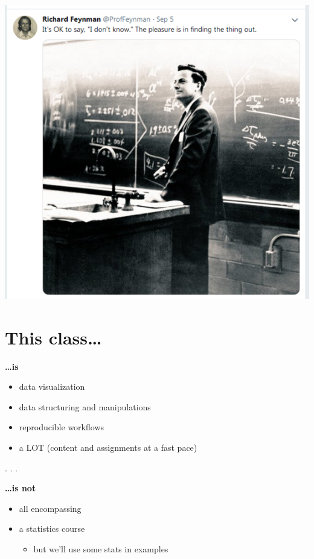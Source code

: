 \documentclass[
  letterpaper,
  DIV=11,
  numbers=noendperiod,
  oneside]{scrartcl}
\providecommand{\tightlist}{%
  \setlength{\itemsep}{0pt}\setlength{\parskip}{0pt}}\usepackage{longtable,booktabs,array}
\begin{document}
\includegraphics{./images/feynman_problemsolve.png}

\hypertarget{this-class}{%
\section{This class\ldots{}}\label{this-class}}

\textbf{\ldots is}

\begin{itemize}
\tightlist
\item
  data visualization
\item
  data structuring and manipulations
\item
  reproducible workflows
\item
  a LOT (content and assignments at a fast pace)
\end{itemize}

. . .

\textbf{\ldots is not}

\begin{itemize}
\tightlist
\item
  all encompassing
\item
  a statistics course

  \begin{itemize}
  \tightlist
  \item
    but we'll use some stats in examples
  \end{itemize}
\end{itemize}
\end{document}
